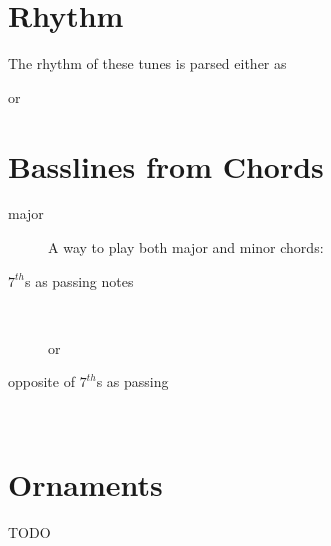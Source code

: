 

\section{Rhythm}
The rhythm of these tunes is parsed either as\
\begin{center}
\end{center}
or
\begin{center}
\end{center}

\section{Basslines from Chords}

\begin{description}

\item[major]
A way to play both major and minor chords:
\begin{center}
\end{center}

\item[$7^{th}$s as passing notes] \ 
\begin{center}
\end{center}
or
\begin{center}
\end{center}

\item[opposite of $7^{th}$s as passing] \ 
\begin{center}
\end{center}
\end{description}

\section{Ornaments}
TODO

